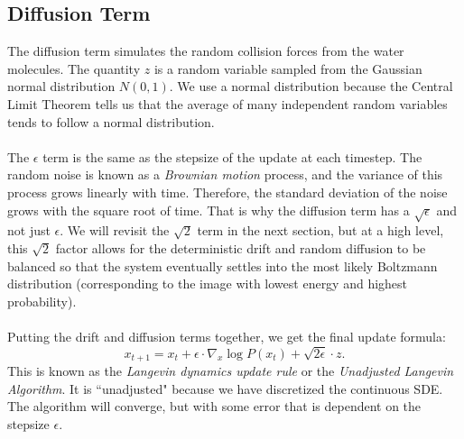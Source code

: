 \documentclass{article}
\begin{document}
\subsection{Diffusion Term}
The diffusion term simulates the random collision forces from the water molecules. The quantity $z$ is a random variable sampled from the Gaussian normal distribution $N(0,1)$. We use a normal distribution because the Central Limit Theorem tells us that the average of many independent random variables tends to follow a normal distribution. 
\\
\\
The $\epsilon$ term is the same as the stepsize of the update at each timestep. The random noise is known as a \textit{Brownian motion} process, and the variance of this process grows linearly with time. Therefore, the standard deviation of the noise grows with the square root of time. That is why the diffusion term has a $\sqrt{\epsilon}$ and not just $\epsilon$. We will revisit the $\sqrt{2}$ term in the next section, but at a high level, this $\sqrt{2}$ factor allows for the deterministic drift and random diffusion to be balanced so that the system eventually settles into the most likely Boltzmann distribution (corresponding to the image with lowest energy and highest probability). 
\\
\\
Putting the drift and diffusion terms together, we get the final update formula:
\[x_{t+1} = x_t + \epsilon \cdot \nabla_x \log P(x_t) + \sqrt{2\epsilon} \cdot z.\]
This is known as the \textit{Langevin dynamics update rule} or the \textit{Unadjusted Langevin Algorithm}. It is ``unadjusted" because we have discretized the continuous SDE. The algorithm will converge, but with some error that is dependent on the stepsize $\epsilon$.

\end{document}
